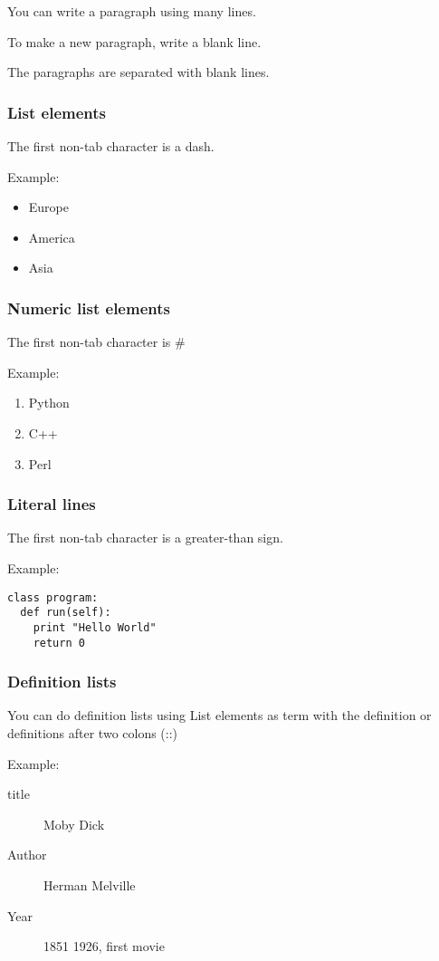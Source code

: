 \documentclass[a4paper,11pt]{article}
\begin{document}
You can write a paragraph using many lines. 

To make a new paragraph, write a blank line.

The paragraphs are separated with blank lines.

\subsubsection{List elements}
The first non-tab character is a dash.

Example:

\begin{itemize}
\item  Europe
\item  America
\item  Asia
\end{itemize}
\subsubsection{Numeric list elements}
The first non-tab character is #

Example:

\begin{enumerate}
\item  Python
\item  C++
\item  Perl
\end{enumerate}
\subsubsection{Literal lines}
The first non-tab character is a greater-than sign.

Example:

\begin{verbatim}
class program:
  def run(self):
    print "Hello World"
    return 0
\end{verbatim}
\subsubsection{Definition lists}
You can do definition lists using List elements as term with the definition or definitions after two colons (::)

Example:

\begin{description}
\item[ title]
 Moby Dick
\item[ Author]
 Herman Melville
\item[ Year]
 1851
 1926, first movie
\end{description}
\end{document}
